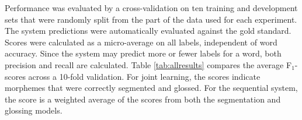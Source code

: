 Performance was evaluated by a cross-validation on ten training and development sets that were randomly split from the part of the data used for each experiment.
The system predictions were automatically evaluated against the gold standard. Scores were calculated as a micro-average on all labels, independent of word accuracy. Since the system may predict more or fewer labels for a word, both precision and recall are calculated. Table \ref{tab:allresults} compares the average F$_1$-scores across a 10-fold validation. 
For joint learning, the scores indicate morphemes that were correctly segmented and glossed. For the sequential system, the score is a weighted average of the scores from both the segmentation and glossing models. 

